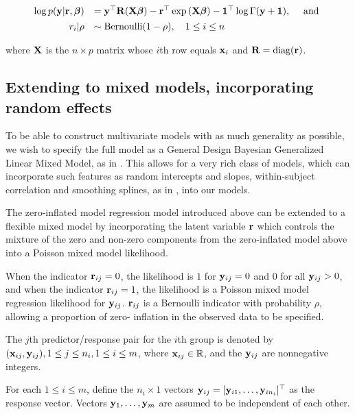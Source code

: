 \begin{equation*}%
	\begin{array}{rl}
		\log p(\vy|\vr, \vbeta) 
		    & = \vy^\top \mR (\mX\vbeta)                           
		- \vr^\top \exp{(\mX\vbeta)} 
		- \vone^\top \log{\Gamma{(\vy + \vone)}}, \quad \mbox{ and }\\ [1ex]
		r_i | \rho & \sim \text{Bernoulli}(1-\rho), \quad 1 \leq i \leq n \\
	\end{array}
\end{equation*}

\noindent where ${\bf X}$ is the $n\times p$ matrix whose $i$th row equals ${\bf x}_i$ and ${\bf R} = \text{diag}{({\bf r})}$.

\subsection{Extending to mixed models, incorporating random effects}

To be able to construct multivariate models with as much generality as possible, we wish to specify the full
model as a General Design Bayesian Generalized Linear Mixed Model, as in \cite{Zhao2006}. This allows for a
very rich class of models, which can incorporate such features as random intercepts and slopes, within-subject
correlation and smoothing splines, as in \cite{Wand2008}, into our models.

The zero-inflated model regression model introduced above can be extended to a flexible mixed model by
incorporating the latent variable ${\bf r}$ which controls the mixture of the zero and non-zero components from
the zero-inflated model above into a Poisson mixed model likelihood.

When the indicator ${\bf r}_{ij} = 0$, the likelihood is $1$ for ${\bf y}_{ij} = 0$ and $0$ for all ${\bf y}_{ij} > 0$,
and when the indicator ${\bf r}_{ij} = 1$, the likelihood is a Poisson mixed model regression likelihood for
${\bf y}_{ij}$. ${\bf r}_{ij}$ is a Bernoulli indicator with probability $\rho$, allowing a proportion of zero-
inflation in the observed data to be specified.

The $j$th predictor/response pair for the $i$th group is denoted by $({\bf x}_{ij}, {\bf y}_{ij}), 1 \leq j \leq n_i, 1 \leq i \leq m$, where ${\bf x}_{ij} \in {\mathbb{R}}$, and the ${\bf y}_{ij}$ are nonnegative integers.

For each $1 \leq i \leq m$, define the $n_i \times 1$ vectors ${\bf y}_{ij} = [{\bf y}_{i 1}, \ldots, {\bf y}_{i
n_i}]^\top$ as the response vector. Vectors ${\bf y}_1, \ldots, {\bf y}_m$ are assumed to be independent of each other.

